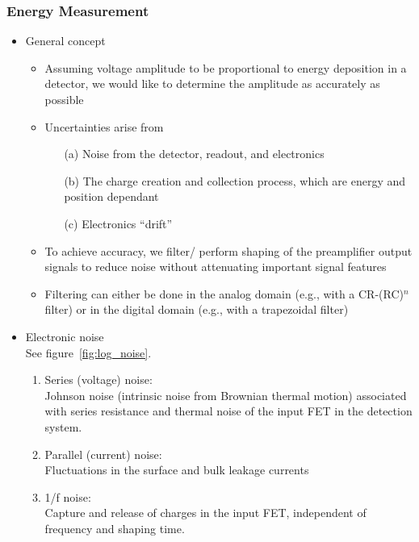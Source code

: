 \subsubsection{Energy Measurement}
\begin{itemize}
    \item General concept
    \begin{itemize}
        \item Assuming voltage amplitude to be proportional to energy deposition in a detector, we would like to determine the amplitude as accurately as possible
        \item Uncertainties arise from 
        \begin{itemize}
            \item[(a)] Noise from the detector, readout, and electronics
            \item[(b)] The charge creation and collection process, which are energy and position dependant
            \item[(c)] Electronics ``drift''
        \end{itemize}
        \item To achieve accuracy, we filter/ perform shaping of the preamplifier output signals to reduce noise without attenuating important signal features
        \item Filtering can either be done in the analog domain (e.g., with a CR-(RC)$^n$ filter) or in the digital domain (e.g., with a trapezoidal filter)
    \end{itemize}
    \item Electronic noise\\
    See figure~\ref{fig:log_noise}.
    \begin{enumerate}
        \item Series (voltage) noise:\\
        Johnson noise (intrinsic noise from Brownian thermal motion) associated with series resistance and thermal noise of the input FET in the detection system. 
        \item Parallel (current) noise:\\
        Fluctuations in the surface and bulk leakage currents
        \item 1/f noise:\\
        Capture and release of charges in the input FET, independent of frequency and shaping time.
    \end{enumerate}
    \begin{figure}[ht]
        \centering

\end{figure}
\end{itemize}
